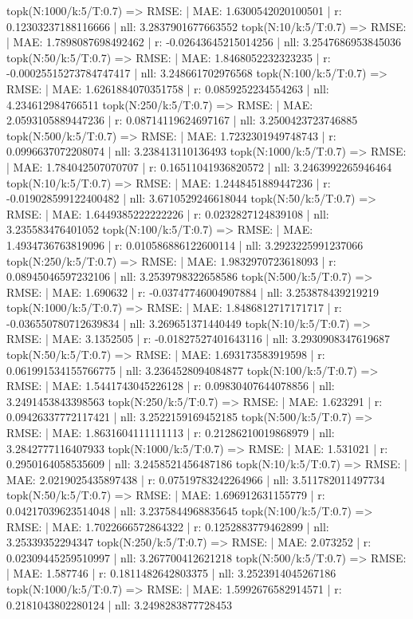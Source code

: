 topk(N:1000/k:5/T:0.7) => RMSE: | MAE: 1.6300542020100501 | r: 0.12303237188116666 | nll: 3.2837901677663552
topk(N:10/k:5/T:0.7) => RMSE: | MAE: 1.7898087698492462 | r: -0.02643645215014256 | nll: 3.2547686953845036
topk(N:50/k:5/T:0.7) => RMSE: | MAE: 1.8468052232323235 | r: -0.00025515273784747417 | nll: 3.248661702976568
topk(N:100/k:5/T:0.7) => RMSE: | MAE: 1.6261884070351758 | r: 0.0859252234554263 | nll: 4.234612984766511
topk(N:250/k:5/T:0.7) => RMSE: | MAE: 2.0593105889447236 | r: 0.08714119624697167 | nll: 3.2500423723746885
topk(N:500/k:5/T:0.7) => RMSE: | MAE: 1.7232301949748743 | r: 0.0996637072208074 | nll: 3.238413110136493
topk(N:1000/k:5/T:0.7) => RMSE: | MAE: 1.784042507070707 | r: 0.16511041936820572 | nll: 3.2463992265946464
topk(N:10/k:5/T:0.7) => RMSE: | MAE: 1.2448451889447236 | r: -0.019028599122400482 | nll: 3.6710529246618044
topk(N:50/k:5/T:0.7) => RMSE: | MAE: 1.6449385222222226 | r: 0.0232827124839108 | nll: 3.235583476401052
topk(N:100/k:5/T:0.7) => RMSE: | MAE: 1.4934736763819096 | r: 0.010586886122600114 | nll: 3.2923225991237066
topk(N:250/k:5/T:0.7) => RMSE: | MAE: 1.9832970723618093 | r: 0.08945046597232106 | nll: 3.2539798322658586
topk(N:500/k:5/T:0.7) => RMSE: | MAE: 1.690632 | r: -0.03747746004907884 | nll: 3.253878439219219
topk(N:1000/k:5/T:0.7) => RMSE: | MAE: 1.8486812717171717 | r: -0.036550780712639834 | nll: 3.269651371440449
topk(N:10/k:5/T:0.7) => RMSE: | MAE: 3.1352505 | r: -0.01827527401643116 | nll: 3.2930908347619687
topk(N:50/k:5/T:0.7) => RMSE: | MAE: 1.693173583919598 | r: 0.061991534155766775 | nll: 3.2364528094084877
topk(N:100/k:5/T:0.7) => RMSE: | MAE: 1.5441743045226128 | r: 0.09830407644078856 | nll: 3.2491453843398563
topk(N:250/k:5/T:0.7) => RMSE: | MAE: 1.623291 | r: 0.09426337772117421 | nll: 3.2522159169452185
topk(N:500/k:5/T:0.7) => RMSE: | MAE: 1.8631604111111113 | r: 0.21286210019868979 | nll: 3.2842777116407933
topk(N:1000/k:5/T:0.7) => RMSE: | MAE: 1.531021 | r: 0.2950164058535609 | nll: 3.2458521456487186
topk(N:10/k:5/T:0.7) => RMSE: | MAE: 2.0219025435897438 | r: 0.07519783242264966 | nll: 3.511782011497734
topk(N:50/k:5/T:0.7) => RMSE: | MAE: 1.696912631155779 | r: 0.04217039623514048 | nll: 3.2375844968835645
topk(N:100/k:5/T:0.7) => RMSE: | MAE: 1.7022666572864322 | r: 0.1252883779462899 | nll: 3.25339352294347
topk(N:250/k:5/T:0.7) => RMSE: | MAE: 2.073252 | r: 0.02309445259510997 | nll: 3.267700412621218
topk(N:500/k:5/T:0.7) => RMSE: | MAE: 1.587746 | r: 0.1811482642803375 | nll: 3.2523914045267186
topk(N:1000/k:5/T:0.7) => RMSE: | MAE: 1.5992676582914571 | r: 0.2181043802280124 | nll: 3.2498283877728453
